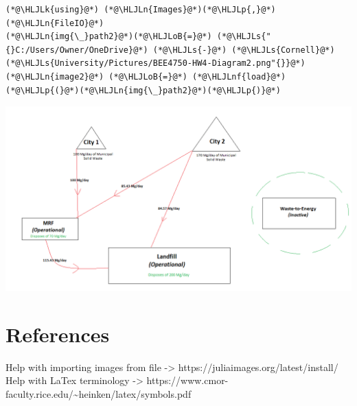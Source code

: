 \documentclass[12pt,a4paper]{article}
\newcommand{\HLJLk}[1]{\textcolor[RGB]{148,91,176}{\textbf{#1}}}
\newcommand{\HLJLn}[1]{#1}
\newcommand{\HLJLnf}[1]{\textcolor[RGB]{66,102,213}{#1}}
\newcommand{\HLJLs}[1]{\textcolor[RGB]{201,61,57}{#1}}
\newcommand{\HLJLoB}[1]{\textcolor[RGB]{102,102,102}{\textbf{#1}}}
\newcommand{\HLJLp}[1]{#1}
\begin{document}
\begin{lstlisting}
(*@\HLJLk{using}@*) (*@\HLJLn{Images}@*)(*@\HLJLp{,}@*) (*@\HLJLn{FileIO}@*)
(*@\HLJLn{img{\_}path2}@*)(*@\HLJLoB{=}@*) (*@\HLJLs{"{}C:/Users/Owner/OneDrive}@*) (*@\HLJLs{-}@*) (*@\HLJLs{Cornell}@*) (*@\HLJLs{University/Pictures/BEE4750-HW4-Diagram2.png"{}}@*)
(*@\HLJLn{image2}@*) (*@\HLJLoB{=}@*) (*@\HLJLnf{load}@*)(*@\HLJLp{(}@*)(*@\HLJLn{img{\_}path2}@*)(*@\HLJLp{)}@*)
\end{lstlisting}

\includegraphics[width=\linewidth]{figures/solution-template_9_1.png}

\section{References}
Help with importing images from file -> https://juliaimages.org/latest/install/ Help with LaTex terminology -> https://www.cmor-faculty.rice.edu/{\textasciitilde}heinken/latex/symbols.pdf
\end{document}
